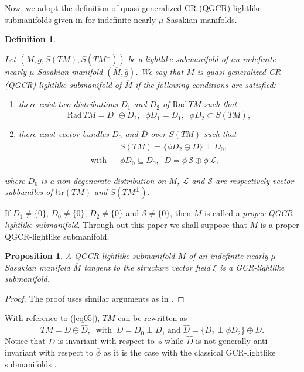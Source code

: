 \documentclass[reqno, 12pt]{amsart}
\numberwithin{equation}{section}
\newtheorem{proposition}[theorem]{Proposition}
\newtheorem{definition}[theorem]{Definition}
\begin{document}
Now, we adopt the definition of quasi generalized CR (QGCR)-lightlike submanifolds given in \cite{ms} for indefinite nearly $\mu$-Sasakian manifolds.
\begin{definition} \label{def2}{\rm Let $(M,g,S(TM),S(TM^\perp))$  be a lightlike submanifold of an indefinite nearly $\mu$-Sasakian manifold $(\overline{M}, \overline{g})$. We say that $M$ is quasi generalized CR (QGCR)-lightlike submanifold of $\overline{M}$ if the following conditions are satisfied:
\begin{enumerate}
 \item [(i)] there exist two distributions $D_1$ and $D_2$ of $\textrm{Rad}\,TM$  such that 
        \begin{equation}\label{eq03}
             \mathrm{Rad}\, TM = D_1\oplus D_2, \;\;\overline{\phi} D_1=D_1, \;\;\overline{\phi} D_2\subset S(TM),
        \end{equation}
 \item [(ii)] there exist vector bundles $D_0$ and $\overline{D}$ over $S(TM)$ such that 
         \begin{align} 
              & S(TM)=\{\overline{\phi} D_2 \oplus \overline{D}\}\perp D_0,\\ 
              \mbox{with}\;\;\; &\overline{\phi}D_{0} \subseteq D_{0},\;\;   \overline{D}= \overline{\phi} \, \mathcal{S}\oplus \overline{\phi} \,\mathcal{L}, \label{s81}
         \end{align}    
\end{enumerate}
where $D_0$ is a non-degenerate distribution on $M$, $\mathcal{L}$ and $\mathcal{S}$ are respectively vector subbundles of $l\mathrm{tr}(TM)$  and $S(TM^{\perp})$.
}
\end{definition}

If $D_{1}\neq \{0\}$, $D_0\neq \{0\}$, $D_2\neq \{0\}$ and $\mathcal{S}\neq \{0\}$, then $M$ is called a \textit{proper QGCR-lightlike submanifold}. Through out this paper we shall suppose that $M$ is a proper QGCR-lightlike submanifold.

\begin{proposition}
 A QGCR-lightlike submanifold $M$ of an indefinite nearly $\mu$-Sasakian manifold $\overline{M}$ tangent to the structure vector field $\xi$ is a GCR-lightlike submanifold.
 \end{proposition} 
 \begin{proof}
The proof uses similar arguments as in \cite{ms}.
 \end{proof}
With reference to  (\ref{eq05}), $TM$ can be rewritten as
\begin{equation}
 TM  =D \oplus \widehat{D}, \;\; \mbox{with}\;\;D =D_0\perp D_{1}\;\mbox{and}\;\widehat{D}=\{D_{2}\perp\overline{\phi} D_{2}\} \oplus\overline{D}.\nonumber
\end{equation} 
Notice that $D$ is invariant with respect to $\overline{\phi}$ while $\widehat{D}$ is not generally anti-invariant with respect to $\overline{\phi}$ as it is the case with the classical GCR-lightlike submanifolds \cite{ds3}.
\end{document}
